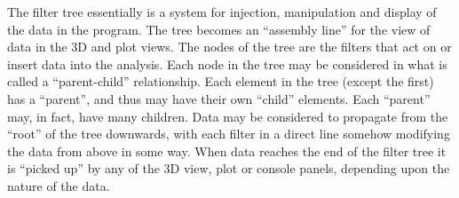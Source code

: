 \documentclass[10pt]{article}
\begin{document}
The filter tree essentially is a system for injection, manipulation and display of the data in the program. The tree becomes an ``assembly line'' for the view of data in the 3D and plot views.  The nodes of the tree are the filters that act on or insert data into the analysis. Each node in the tree may be considered in what is called a ``parent-child'' relationship. Each element in the tree (except the first) has a ``parent'', and thus may have their own ``child'' elements. Each ``parent'' may, in fact, have many children. Data may be considered to propagate from the ``root'' of the tree downwards, with each filter in a direct line somehow modifying the data from above in some way. When data reaches the end of the filter tree it is ``picked up'' by any of the 3D view, plot or console panels, depending upon the nature of the data. 	
\end{document}

